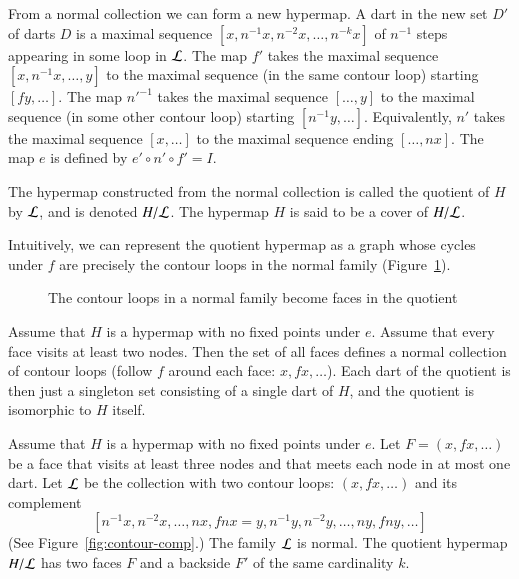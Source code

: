 From a normal collection we can form a new hypermap.   A dart in the
new set $D'$ of darts
$D$ is a maximal sequence $[x,n^{-1} x, n^{-2} x,\ldots,n^{-k} x]$
    of $n^{-1}$ steps appearing in some loop in $\cal L$.
The map $f'$ takes the maximal sequence
    $[x,n^{-1}x,\ldots,y]$ to the maximal
   sequence (in the same contour loop) starting 
    $[f y,\ldots]$.
The map ${n'}^{-1}$ takes the maximal sequence
    $[\ldots,y]$ to the maximal sequence (in some other contour loop)
starting $[n^{-1}y,\ldots]$. Equivalently, 
$n'$ takes the maximal sequence
$[x,\ldots]$ to the maximal sequence ending $[\ldots,n x]$. The map $e$ is
defined by $e'\circ n'\circ f' = I$.  

\begin{definition}[quotient]  The hypermap constructed from the normal collection
is called the quotient of $H$ by $\cal L$, and is denoted $H/{\cal
L}$.  The hypermap $H$ is said to be a cover of $H/{\cal L}$.
\end{definition}

Intuitively, we can represent the quotient hypermap as a graph whose
cycles under $f$ 
are precisely the contour loops in the normal family (Figure~\ref{fig:quot}).

\begin{figure}[htb]
  \centering
  \caption{The contour loops in a normal 
   family become faces in the
   quotient}
  \label{fig:quot}
\end{figure}


\begin{example}\label{ex:Hall} 
Assume that $H$ is a hypermap with no fixed points under $e$.
Assume that every face visits at least two nodes.
Then the set of all faces
defines a normal collection of contour loops (follow $f$ around each face:
$x,f x,\ldots$).  Each dart of the quotient is then just a singleton
set consisting of a single dart of $H$, and the quotient is
isomorphic to $H$ itself.
\end{example}

\begin{example}\label{ex:H2} 
Assume that $H$ is a hypermap with no fixed points
under $e$.  Let $F = (x,f x,\ldots)$ be a face 
that visits at least
three nodes and that meets each node in at most one dart.
Let $\cal L$ be the
collection with two contour loops:  $(x,f x,\ldots)$ and its
complement
$$[n^{-1} x,
n^{-2} x,\ldots,n x,f n x = y,n^{-1} y, n^{-2} y,\ldots, n y, f n
y,\ldots]
$$
(See Figure~\ref{fig:contour-comp}.) 
The family $\cal L$ is normal.
The quotient hypermap $H/{\cal L}$ has two faces $F$ and a
backside $F'$ of the same cardinality $k$.
\end{example}


